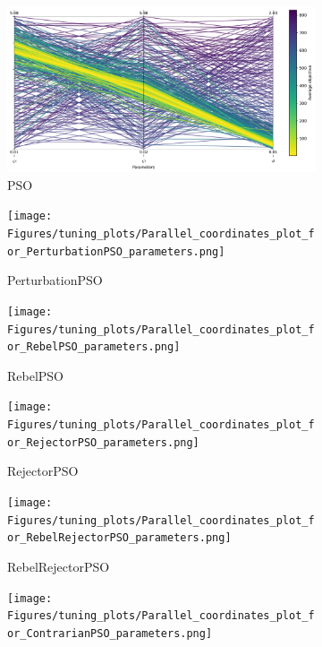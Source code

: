 \begin{figure}[H]
    \centering
    \begin{subfigure}{0.49\textwidth}
        \centering
        \includegraphics[width=1\textwidth]{Figures/tuning_plots/Parallel_coordinates_plot_for_PSO_parameters.png}
        \caption{PSO}
    \end{subfigure}
    \begin{subfigure}{0.49\textwidth}
        \centering
        \texttt{[image: Figures/tuning\_plots/Parallel\_coordinates\_plot\_for\_PerturbationPSO\_parameters.png]}
        \caption{PerturbationPSO}
    \end{subfigure}
    \begin{subfigure}{0.49\textwidth}
        \centering
        \texttt{[image: Figures/tuning\_plots/Parallel\_coordinates\_plot\_for\_RebelPSO\_parameters.png]}
        \caption{RebelPSO}
    \end{subfigure}
    \begin{subfigure}{0.49\textwidth}
        \centering
        \texttt{[image: Figures/tuning\_plots/Parallel\_coordinates\_plot\_for\_RejectorPSO\_parameters.png]}
        \caption{RejectorPSO}
    \end{subfigure}
        \begin{subfigure}{0.49\textwidth}
        \centering
        \texttt{[image: Figures/tuning\_plots/Parallel\_coordinates\_plot\_for\_RebelRejectorPSO\_parameters.png]}
        \caption{RebelRejectorPSO}
    \end{subfigure}
        \begin{subfigure}{0.49\textwidth}
        \centering
        \texttt{[image: Figures/tuning\_plots/Parallel\_coordinates\_plot\_for\_ContrarianPSO\_parameters.png]}

\end{subfigure}
\end{figure}
